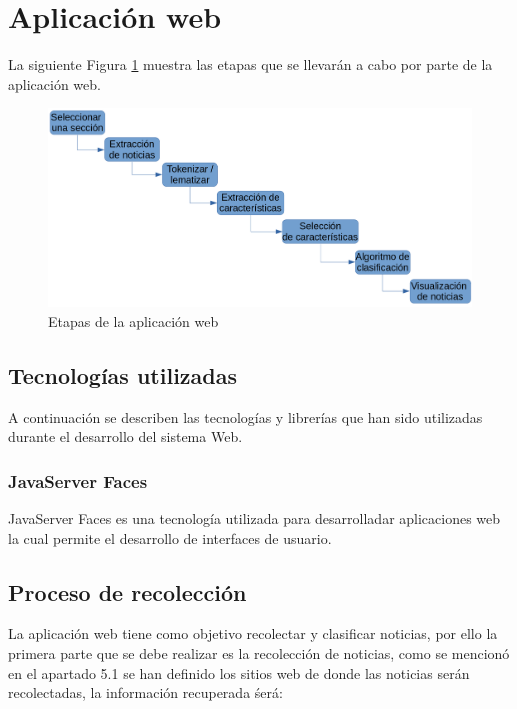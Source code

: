 \section{Aplicación web}

La siguiente Figura \ref{fig:procesoApp} muestra las etapas que se llevarán a cabo por parte de la aplicación web.
\begin{figure}[ht]
\centering
\includegraphics[scale=0.3]{imagenes/Capitulo5/procesoAplicacionWeb.png}
\caption{Etapas de la aplicación web}
\label{fig:procesoApp}
\end{figure}

\subsection{Tecnologías utilizadas}
A continuación se describen las tecnologías y librerías que han sido utilizadas durante el desarrollo del sistema Web.

\subsubsection{JavaServer Faces}
JavaServer Faces es una tecnología utilizada para desarrolladar aplicaciones web la cual permite el desarrollo de interfaces de usuario.

\subsubsection{}

\subsection{Proceso de recolección}
La aplicación web tiene como objetivo recolectar y clasificar noticias, por ello la primera parte que se debe realizar es la recolección de noticias, como se mencionó en el apartado 5.1 se han definido los sitios web de donde las noticias serán recolectadas, la información recuperada śerá:

